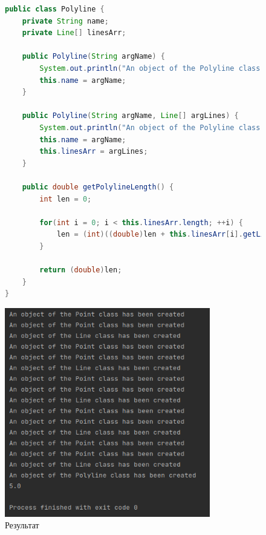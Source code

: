 \documentclass[a4paper, 14pt]{extarticle}
\begin{document}
\newpage

\begin{figure}[!htb]
\begin{lstlisting}[language=Java,caption={Класс Polyline},label={lst:polyline}]
public class Polyline {
    private String name;
    private Line[] linesArr;

    public Polyline(String argName) {
        System.out.println("An object of the Polyline class has been created");
        this.name = argName;
    }

    public Polyline(String argName, Line[] argLines) {
        System.out.println("An object of the Polyline class has been created");
        this.name = argName;
        this.linesArr = argLines;
    }

    public double getPolylineLength() {
        int len = 0;

        for(int i = 0; i < this.linesArr.length; ++i) {
            len = (int)((double)len + this.linesArr[i].getLineLength());
        }

        return (double)len;
    }
}
\end{lstlisting}
\end{figure}


\begin{figure}[!htb]
	\centering
	\includegraphics[width=0.8\textwidth]{output.png}
\caption{Результат}
\label{fig:output}
\end{figure}
\end{document}
